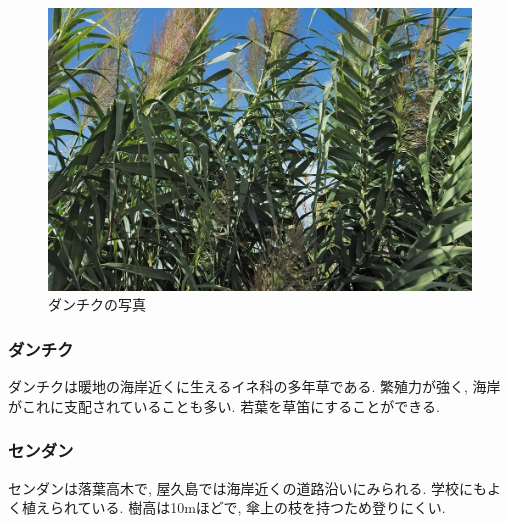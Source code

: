 \documentclass[10pt,titlepage,a5paper]{ltjsbook}
\begin{document}
    \vfill
    \newpage
    \begin{minipage}{0.38\columnwidth}
      \begin{figure}[H]
          \centering
          \includegraphics[width=\columnwidth]{danchiku.jpg}
          \caption{ダンチクの写真}
          \label{fig:danchiku_photo}
      \end{figure}
    \end{minipage}
    \hfill
    \begin{minipage}{0.58\columnwidth}
      \subsubsection*{ダンチク}
        ダンチクは暖地の海岸近くに生えるイネ科の多年草である. 繁殖力が強く, 海岸がこれに支配されていることも多い. 若葉を草笛にすることができる.
    \end{minipage}
    \vfill
    \begin{minipage}{0.58\columnwidth}
      \subsubsection*{センダン}
        センダンは落葉高木で, 屋久島では海岸近くの道路沿いにみられる. 学校にもよく植えられている. 樹高は10mほどで, 傘上の枝を持つため登りにくい.
    \end{minipage}
    \hfill
\end{document}
